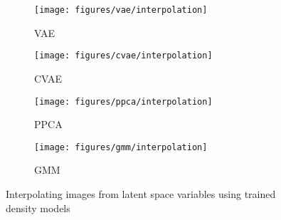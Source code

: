 \begin{figure}[!h]
	\begin{subfigure}[t]{0.49\textwidth}
		\centering
		\texttt{[image: figures/vae/interpolation]}
		\caption{VAE}
	\end{subfigure}
	\begin{subfigure}[t]{0.49\textwidth}
		\centering
		\texttt{[image: figures/cvae/interpolation]}
		\caption{CVAE}
	\end{subfigure}
	\begin{subfigure}[t]{0.49\textwidth}
		\centering
		\texttt{[image: figures/ppca/interpolation]}
		\caption{PPCA}
	\end{subfigure}
	\begin{subfigure}[t]{0.49\textwidth}
		\centering
		\texttt{[image: figures/gmm/interpolation]}
		\caption{GMM}
	\end{subfigure}
	\caption{Interpolating images from latent space variables using trained density models}	
\end{figure}